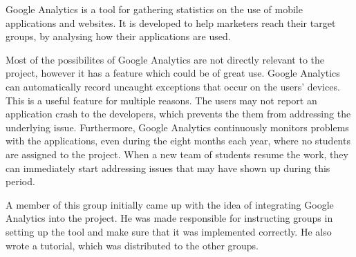 Google Analytics is a tool for gathering statistics on the use of mobile applications and websites. 
It is developed to help marketers reach their target groups, by analysing how their applications are used.

Most of the possibilites of Google Analytics are not directly relevant to the \giraf project, however it has a feature which could be of great use.
Google Analytics can automatically record uncaught exceptions that occur on the users' devices.
This is a useful feature for multiple reasons. 
The users may not report an application crash to the developers, which prevents the them from addressing the underlying issue. 
Furthermore, Google Analytics continuously monitors problems with the applications, even during the eight months each year, where no students are assigned to the project. 
When a new team of students resume the work, they can immediately start addressing issues that may have shown up during this period.

A member of this group initially came up with the idea of integrating Google Analytics into the \giraf project.
He was made responsible for instructing groups in setting up the tool and make sure that it was implemented correctly.
He also wrote a tutorial, which was distributed to the other groups.